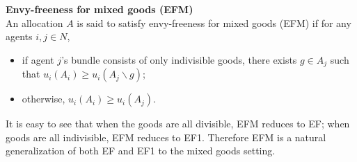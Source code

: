 \textbf{Envy-freeness for mixed goods (EFM)}\\
An allocation $A$ is said to satisfy envy-freeness for mixed goods (EFM) if for any agents $i,j \in N$,
\begin{itemize}
    \item if agent $j$'s bundle consists of only indivisible goods, there exists $g \in A_j$ such that $u_i(A_i) \geq u_i(A_j \backslash {g})$;
    \item otherwise, $u_i(A_i) \geq u_i(A_j)$.
\end{itemize}
It is easy to see that when the goods are all divisible, EFM reduces to EF; when goods are all indivisible, EFM reduces to EF1. Therefore EFM is a natural generalization of both EF and EF1 to the mixed goods setting.
